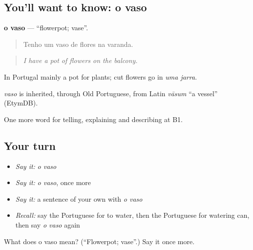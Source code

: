 \subsection*{You'll want to know: o vaso}
\textbf{o vaso} — \textquotedblleft{}flowerpot; vase\textquotedblright{}.

\begin{quote}
Tenho um vaso de flores na varanda.
\end{quote}

\begin{quote}
\emph{I have a pot of flowers on the balcony.}
\end{quote}

In Portugal mainly a pot for plants; cut flowers go in \emph{uma jarra}.

\begin{cousinweb}
\emph{vaso} is inherited, through Old Portuguese, from Latin \emph{vāsum} \textquotedblleft{}a vessel\textquotedblright{} (EtymDB).
\end{cousinweb}

\begin{grammarlens}[title={What you've built}]
One more word for telling, explaining and describing at B1.
\end{grammarlens}

\subsection*{Your turn}
\begin{itemize}
\raggedright
  \item \emph{Say it:} \emph{o vaso}
  \item \emph{Say it:} \emph{o vaso}, once more
  \item \emph{Say it:} a sentence of your own with \emph{o vaso}
  \item \emph{Recall:} say the Portuguese for to water, then the Portuguese for watering can, then say \emph{o vaso} again
\end{itemize}

\begin{tcolorbox}[breakable,colback=teal!4,colframe=teal!35!black,title={Before you move on}]
What does o vaso mean? (\textquotedblleft{}Flowerpot; vase\textquotedblright{}.) Say it once more.
\end{tcolorbox}
